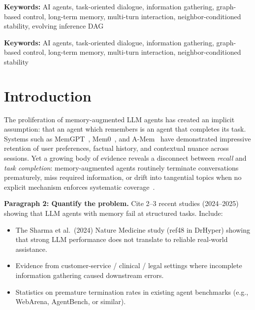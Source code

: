 \documentclass[11pt,a4paper]{article}
\newcommand{\placeholder}[1]{%
  \begin{tcolorbox}[colback=yellow!10,colframe=orange!60!black,
    fonttitle=\bfseries,title=Placeholder]
    #1
  \end{tcolorbox}%
}
\begin{document}
\vspace{1em}
\noindent\textbf{Keywords:} AI agents, task-oriented dialogue, information
gathering, graph-based control, long-term memory, multi-turn interaction,
neighbor-conditioned stability, evolving inference DAG

\vspace{1em}
\noindent\textbf{Keywords:} AI agents, task-oriented dialogue, information
gathering, graph-based control, long-term memory, multi-turn interaction,
neighbor-conditioned stability

\section{Introduction}
\label{sec:intro}

The proliferation of memory-augmented LLM agents has created an implicit
assumption: that an agent which remembers is an agent that completes its task.
Systems such as MemGPT~\cite{packer2023memgpt}, Mem0~\cite{mem0_2024},
and A-Mem~\cite{amem_2024} have demonstrated impressive retention of user
preferences, factual history, and contextual nuance across sessions. Yet a
growing body of evidence reveals a disconnect between \emph{recall} and
\emph{task completion}: memory-augmented agents routinely terminate
conversations prematurely, miss required information, or drift into tangential
topics when no explicit mechanism enforces systematic
coverage~\cite{ref_interaction_failure_1, ref_interaction_failure_2}.

\placeholder{%
  \textbf{Paragraph 2: Quantify the problem.}
  Cite 2--3 recent studies (2024--2025) showing that LLM agents with memory
  fail at structured tasks. Include:
  \begin{itemize}[noitemsep]
    \item The Sharma et al.\ (2024) Nature Medicine study (ref48 in DrHyper)
          showing that strong LLM performance does not translate to reliable
          real-world assistance.
    \item Evidence from customer-service / clinical / legal settings where
          incomplete information gathering caused downstream errors.
    \item Statistics on premature termination rates in existing agent
          benchmarks (e.g., WebArena, AgentBench, or similar).
  \end{itemize}
}
\end{document}
